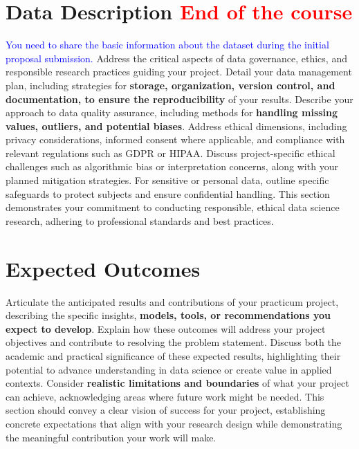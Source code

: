 \documentclass[12pt, onecolumn]{IEEEtran}
\begin{document}
\section{Data Description \textcolor{red}{End of the course}}
\textcolor{blue}{You need to share the basic information about the dataset during the initial proposal submission.}
Address the critical aspects of data governance, ethics, and responsible research practices guiding your project. Detail your data management plan, including strategies for \textbf{storage, organization, version control, and documentation, to ensure the reproducibility} of your results. Describe your approach to data quality assurance, including methods for \textbf{handling missing values, outliers, and potential biases}. Address ethical dimensions, including privacy considerations, informed consent where applicable, and compliance with relevant regulations such as GDPR or HIPAA. Discuss project-specific ethical challenges such as algorithmic bias or interpretation concerns, along with your planned mitigation strategies. For sensitive or personal data, outline specific safeguards to protect subjects and ensure confidential handling. This section demonstrates your commitment to conducting responsible, ethical data science research, adhering to professional standards and best practices.


\section{Expected Outcomes}
Articulate the anticipated results and contributions of your practicum project, describing the specific insights, \textbf{models, tools, or recommendations you expect to develop}. Explain how these outcomes will address your project objectives and contribute to resolving the problem statement. Discuss both the academic and practical significance of these expected results, highlighting their potential to advance understanding in data science or create value in applied contexts. Consider \textbf{realistic limitations and boundaries} of what your project can achieve, acknowledging areas where future work might be needed. This section should convey a clear vision of success for your project, establishing concrete expectations that align with your research design while demonstrating the meaningful contribution your work will make.
\end{document}
